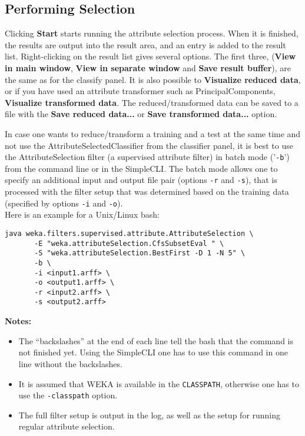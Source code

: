 \documentclass[a4paper]{article}
\begin{document}
\subsection{Performing Selection}

Clicking \textbf{Start} starts running the attribute selection
process.  When it is finished, the results are output into the result
area, and an entry is added to the result list.  Right-clicking on the
result list gives several options. The first three, (\textbf{View in
main window}, \textbf{View in separate window} and \textbf{Save result
buffer}), are the same as for the classify panel.  It is also possible
to \textbf{Visualize reduced data}, or if you have used an attribute
transformer such as PrincipalComponents, \textbf{Visualize transformed
data}. The reduced/transformed data can be saved to a file with the 
\textbf{Save reduced data...} or \textbf{Save transformed data...}
option.

In case one wants to reduce/transform a training and a test at the same 
time and not use the AttributeSelectedClassifier from the classifier 
panel, it is best to use the AttributeSelection filter (a supervised 
attribute filter) in batch mode ('\texttt{-b}') 
from the command line or in the SimpleCLI. The batch mode allows one to 
specify an additional input and output file pair (options \texttt{-r} 
and \texttt{-s}), that is processed with the filter setup that 
was determined based on the training data (specified by options 
\texttt{-i} and \texttt{-o}). \\

\noindent Here is an example for a Unix/Linux bash:
\begin{verbatim}
java weka.filters.supervised.attribute.AttributeSelection \
       -E "weka.attributeSelection.CfsSubsetEval " \
       -S "weka.attributeSelection.BestFirst -D 1 -N 5" \
       -b \
       -i <input1.arff> \
       -o <output1.arff> \
       -r <input2.arff> \
       -s <output2.arff>
\end{verbatim}

\noindent \textbf{Notes:}
\begin{itemize}
	\item The ``backslashes'' at the end of each line tell the bash that 
	the command is not finished yet. Using the SimpleCLI one has to  
	use this command in one line without the backslashes.
	
	\item It is assumed that WEKA is available in the \texttt{CLASSPATH}, 
	otherwise one has to use the \texttt{-classpath} option.
	
	\item The full filter setup is output in the log, as well as
	the setup for running regular attribute selection.
\end{itemize}
\end{document}
